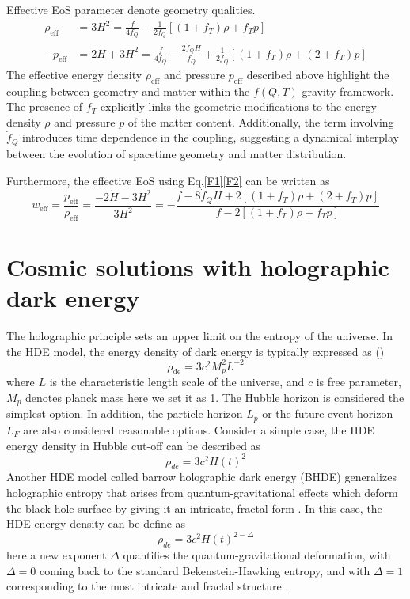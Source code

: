 \documentclass[a4paper,fleqn]{cas-sc}
\begin{document}
Effective EoS parameter denote geometry qualities.
\begin{align}
\rho_{\text{eff}}&=3H^2=\frac{f}{4f_Q}-\frac{1}{2f_Q}[(1+f_T)\rho+f_T p] \label{F1}\\
-p_{\text{eff}}&=2\dot{H}+3H^2=\frac{f}{4f_Q}-\frac{2\dot{f}_Q H}{f_Q}+\frac{1}{2f_Q}[(1+f_T)\rho +(2+f_T)p] \label{F2}
\end{align}
The effective energy density $\rho_{\text{eff}}$ and pressure $p_{\text{eff}}$ described above highlight the coupling between geometry and matter within the $f(Q, T)$ gravity framework. The presence of $f_T$ explicitly links the geometric modifications to the energy density $\rho$ and pressure $p$ of the matter content. Additionally, the term involving $\dot{f}_Q$ introduces time dependence in the coupling, suggesting a dynamical interplay between the evolution of spacetime geometry and matter distribution. 

Furthermore, the effective EoS using Eq.\eqref{F1}\eqref{F2} can be written as
\begin{equation}
w_{\text{eff}}=\frac{p_{\text{eff}}}{\rho_{\text{eff}}} = \frac{-2\dot{H}-3H^2}{3H^2}= -\frac{f - 8\dot{f}_Q H + 2[(1 + f_T)\rho + (2 + f_T)p]}{f - 2[(1 + f_T)\rho + f_T p]}
\end{equation}

\section{Cosmic solutions with holographic dark energy}\label{sec:solution}

The holographic principle sets an upper limit on the entropy of the universe.  In the HDE model, the energy density of dark energy is typically expressed as (\cite{LI20041})
\begin{equation}
    \rho_\text{de} = 3c^2 M_p^2 L^{-2}
\end{equation}
where $L$ is the characteristic length scale of the universe, and $c$ is free parameter, $M_p$ denotes planck mass here we set it as 1. The Hubble horizon is considered the simplest option.  In addition, the particle horizon $L_p$ or the future event horizon $L_F$ are also considered reasonable options. Consider a simple case, the HDE energy density in Hubble cut-off can be described as 
\begin{equation}
    \rho_{de}=3c^2 H(t)^2 \label{HDE}
\end{equation}
Another HDE model called barrow holographic dark energy (BHDE) generalizes holographic entropy that arises from quantum-gravitational effects which deform the black-hole surface by giving it an intricate, fractal form . In this case, the HDE energy density can be define as
\begin{equation}
    \rho_{de}=3c^2 H(t)^{2-\Delta}\label{BHDEdef}
\end{equation}
here a new exponent $\Delta$ quantifies the quantum-gravitational deformation, with $\Delta=0$ coming back to the standard Bekenstein-Hawking entropy, and with $\Delta=1$ corresponding to the most intricate and fractal structure \cite{PhysRevD.102.123525}.
\end{document}

